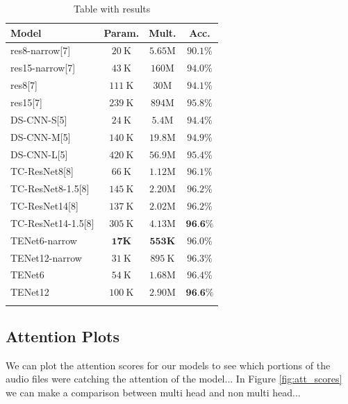 \begin{table}
	\caption{Table with results}
\begin{tabular}{lccc}
	
	\hline 
	Model & Param. & Mult. & Acc. \\
	\hline \hline
	
	res8-narrow[7] & $20 \mathrm{~K}$ & $5.65 \mathrm{M}$ & $90.1 \%$ \\
	res15-narrow[7] & $43 \mathrm{~K}$ & $160 \mathrm{M}$ & $94.0 \%$ \\
	res8[7] & $111 \mathrm{~K}$ & $30 \mathrm{M}$ & $94.1 \%$ \\
	res15[7] & $239 \mathrm{~K}$ & $894 \mathrm{M}$ & $95.8 \%$ \\
	\hline 
	DS-CNN-S[5] & $24 \mathrm{~K}$ & $5.4 \mathrm{M}$ & $94.4 \%$ \\
	DS-CNN-M[5] & $140 \mathrm{~K}$ & $19.8 \mathrm{M}$ & $94.9 \%$ \\
	DS-CNN-L[5] & $420 \mathrm{~K}$ & $56.9 \mathrm{M}$ & $95.4 \%$ \\
	\hline TC-ResNet8[8] & $66 \mathrm{~K}$ & $1.12 \mathrm{M}$ & $96.1 \%$ \\
	TC-ResNet8-1.5[8] & $145 \mathrm{~K}$ & $2.20 \mathrm{M}$ & $96.2 \%$ \\
	TC-ResNet14[8] & $137 \mathrm{~K}$ & $2.02 \mathrm{M}$ & $96.2 \%$ \\
	TC-ResNet14-1.5[8] & $305 \mathrm{~K}$ & $4.13 \mathrm{M}$ & $\mathbf{9 6 . 6 \%}$ \\
	\hline TENet6-narrow & $\mathbf{1 7 K}$ & $\mathbf{5 5 3 K}$ & $96.0 \%$ \\
	TENet12-narrow & $31 \mathrm{~K}$ & $895 \mathrm{~K}$ & $96.3 \%$ \\
	TENet6 & $54 \mathrm{~K}$ & $1.68 \mathrm{M}$ & $96.4 \%$ \\
	TENet12 & $100 \mathrm{~K}$ & $2.90 \mathrm{M}$ & $\mathbf{9 6 . 6 \%}$ \\
	\hline
	
	\label{table:results}
\end{tabular}
\end{table}

\subsection{Attention Plots}
We can plot the attention scores for our models to see which portions of the audio files were catching the attention of the model... In Figure \ref{fig:att_scores} we can make a comparison between multi head and non multi head...

